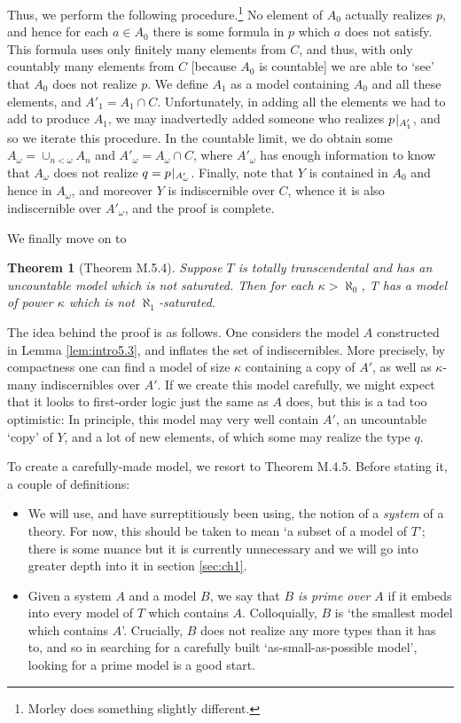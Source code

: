 \documentclass{article}
\newtheorem{theorem}{Theorem}[section]
\theoremstyle{nonumberplain}
\newcommand{\rst}[2]{#1\mspace{1.3mu plus 0.5mu minus 0.5mu}|_{#2}}
\begin{document}
Thus, we perform the following procedure.\footnote{Morley does something slightly different.} No element of $A_0$ actually realizes $p$, and hence for each $a \in A_0$ there is some formula in $p$ which $a$ does not satisfy. This formula uses only finitely many elements from $C$, and thus, with only countably many elements from $C$ [because $A_0$ is countable] we are able to `see' that $A_0$ does not realize $p$. We define $A_1$ as a model containing $A_0$ and all these elements, and $A'_1 = A_1 \cap C$. Unfortunately, in adding all the elements we had to add to produce $A_1$, we may inadvertedly added someone who realizes $\rst p{A'_1}$, and so we iterate this procedure. In the countable limit, we do obtain some $A_\omega = \cup_{n < \omega} A_n$ and $A'_\omega = A_\omega \cap C$, where $A'_\omega$ has enough information to know that $A_\omega$ does not realize $q = \rst p{A'_\omega}$. Finally, note that $Y$ is contained in $A_0$ and hence in $A_\omega$, and moreover $Y$ is indiscernible over $C$, whence it is also indiscernible over $A'_\omega$, and the proof is complete.

We finally move on to
\begin{theorem}[Theorem M.5.4]\label{thm:intro5.4}
Suppose $T$ is totally transcendental and has an uncountable model which is not saturated. Then for each $\kappa > \aleph_0$, T has a model of power $\kappa$ which is not $\aleph_1$-saturated.
\end{theorem}

The idea behind the proof is as follows. One considers the model $A$ constructed in Lemma \ref{lem:intro5.3}, and inflates the set of indiscernibles. More precisely, by compactness one can find a model of size $\kappa$ containing a copy of $A'$, as well as $\kappa$-many indiscernibles over $A'$. If we create this model carefully, we might expect that it looks to first-order logic just the same as $A$ does, but this is a tad too optimistic: In principle, this model may very well contain $A'$, an uncountable `copy' of $Y$, and a lot of new elements, of which some may realize the type $q$.

To create a carefully-made model, we resort to Theorem M.4.5. Before stating it, a couple of definitions:
\begin{itemize}
\item We will use, and have surreptitiously been using, the notion of a \emph{system} of a theory. For now, this should be taken to mean `a subset of a model of $T$'; there is some nuance but it is currently unnecessary and we will go into greater depth into it in section \ref{sec:ch1}.
\item Given a system $A$ and a model $B$, we say that \emph{$B$ is prime over $A$} if it embeds into every model of $T$ which contains $A$. Colloquially, $B$ is `the smallest model which contains $A$'. Crucially, $B$ does not realize any more types than it has to, and so in searching for a carefully built `as-small-as-possible model', looking for a prime model is a good start.
\end{itemize}
\end{document}
